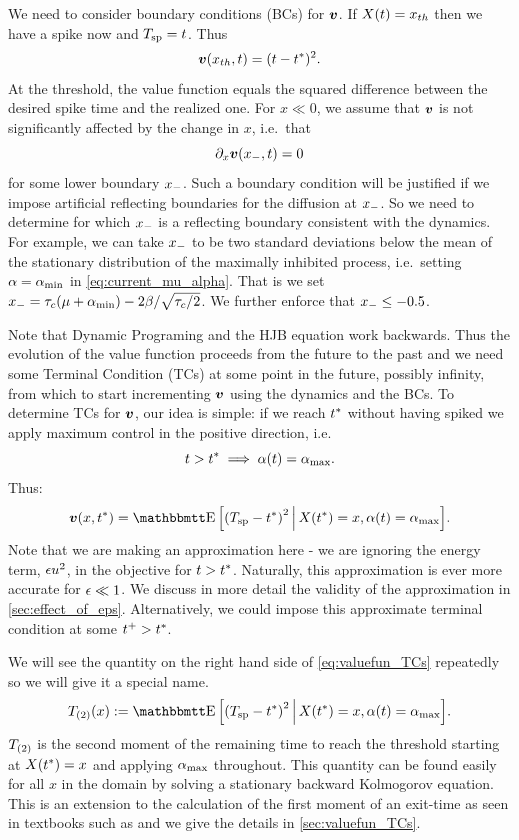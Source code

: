 \documentclass[12pt]{iopart}
\begin{document}
We need to consider boundary conditions (BCs) for ${ \boldsymbol{v} }$. If $X(t) = { x_{th} }$ then we
have a spike now and ${ T_{\textrm{sp} } } = t$. Thus $$ { \boldsymbol{v} }({ x_{th} },t) = (t-{ t^* })^2.$$ At the
threshold, the value function equals the squared difference between the desired
spike time and the realized one. For $x \ll 0$, we assume that ${ \boldsymbol{v} }$ is not
significantly affected by the change in $x$, i.e.\ that $$ {\partial}_x { \boldsymbol{v} }({ x_{-} }, t) =
0 $$ for some lower boundary ${ x_{-} }$. Such a boundary condition will be
justified if we impose artificial reflecting boundaries for the diffusion at
${ x_{-} }$. So we need to determine for which ${ x_{-} }$ is a reflecting boundary
consistent with the dynamics. For example, we can take ${ x_{-} }$ to be two
standard deviations below the mean of the stationary distribution of the
maximally inhibited process, i.e.\ setting ${\alpha}={ {\alpha}_{\textrm{min}} }$ in
\cref{eq:current_mu_alpha}. That is we set ${ x_{-} } = { \tau_{c} }(\mu + { {\alpha}_{\textrm{min}} }) - 2 {\beta} / \sqrt{{ \tau_{c} }/2}$. We further enforce
that ${ x_{-} } \leq -0.5$.

Note that Dynamic Programing and the HJB equation work backwards. Thus the
evolution of the value function proceeds from the future to the past and we need
some Terminal Condition (TCs) at some point in the future, possibly infinity,
from which to start incrementing ${ \boldsymbol{v} }$ using the dynamics and the BCs. To
determine TCs for ${ \boldsymbol{v} }$, our idea is simple: if we reach ${ t^* }$ without having
spiked we apply maximum control in the positive direction, i.e.\ 
$$t>{ t^* } \implies {\alpha}(t) = { {\alpha}_{\textrm{max}} }.$$ Thus: \begin{equation}\v(x,\T) = \Exp
\Big[\trem^2 \,\Big|\, X(\T) = x, \a(t) = \amax \Big].
\label{eq:valuefun_TCs}
\end{equation}
Note that we are making an approximation here
- we are ignoring the energy term, ${\epsilon} u^2$, in the objective for
$t>{ t^* }$. Naturally, this approximation is ever more accurate for ${\epsilon} \ll 1$.
We discuss in more detail the validity of the approximation in
\cref{sec:effect_of_eps}.
Alternatively, we could impose this approximate terminal condition at some $t^+
> { t^* }$.

We will see the quantity on the right hand side of \cref{eq:valuefun_TCs}
repeatedly so we will give it a special name.
\begin{equation}
\Ttwo(x) := \Exp \Big[\trem^2 \,\Big|\, X(\T) = x, \a(t) = \amax \Big].
\label{eq:Trem_squared}
\end{equation}
${ {T}_{(2)} }$ is the second moment of the remaining time to reach the
threshold starting at $X({ t^* }) = x$ and applying ${ {\alpha}_{\textrm{max}} }$ throughout. This quantity
can be found easily for all $x$ in the domain by solving a stationary backward Kolmogorov
equation. This is an extension to the calculation of the first moment of an
exit-time as seen in textbooks such as \cite{Jacobs} and we give the
details in \ref{sec:valuefun_TCs}.
\end{document}
